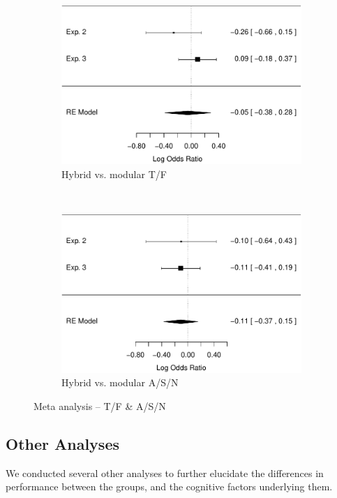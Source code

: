 \documentclass[man,mask,10pt]{apa6}
\begin{document}
\begin{figure}
\begin{subfigure}[c]{0.4\textwidth}
\includegraphics[width=\textwidth]{figures/meta/question_typegenerator_TF_n_conditionhybrid.pdf}
\caption{Hybrid vs. modular T/F}
\end{subfigure}
~
\begin{subfigure}[c]{0.4\textwidth}
\centering
\includegraphics[width=\textwidth]{figures/meta/question_typegenerator_ASN_n_conditionhybrid.pdf}
\caption{Hybrid vs. modular A/S/N}
\end{subfigure}
\caption{Meta analysis -- T/F \& A/S/N}
\label{meta_genTF}
\end{figure}\noindent 
\FloatBarrier
\subsection{Other Analyses}
We conducted several other analyses to further elucidate the differences in performance between the groups, and the cognitive factors underlying them.\\
\end{document}
